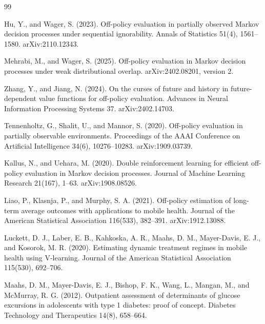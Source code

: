 \documentclass{article}
\begin{document}
\begin{thebibliography}{99}

   Hu, Y., and Wager, S. (2023). Off-policy evaluation in partially observed Markov decision processes under sequential ignorability. Annals of Statistics 51(4), 1561--1580. arXiv:2110.12343.

   Mehrabi, M., and Wager, S. (2025). Off-policy evaluation in Markov decision processes under weak distributional overlap. arXiv:2402.08201, version 2.

   Zhang, Y., and Jiang, N. (2024). On the curses of future and history in future-dependent value functions for off-policy evaluation. Advances in Neural Information Processing Systems 37. arXiv:2402.14703.

   Tennenholtz, G., Shalit, U., and Mannor, S. (2020). Off-policy evaluation in partially observable environments. Proceedings of the AAAI Conference on Artificial Intelligence 34(6), 10276--10283. arXiv:1909.03739.

   Kallus, N., and Uehara, M. (2020). Double reinforcement learning for efficient off-policy evaluation in Markov decision processes. Journal of Machine Learning Research 21(167), 1--63. arXiv:1908.08526.

   Liao, P., Klasnja, P., and Murphy, S. A. (2021). Off-policy estimation of long-term average outcomes with applications to mobile health. Journal of the American Statistical Association 116(533), 382--391. arXiv:1912.13088.

   Luckett, D. J., Laber, E. B., Kahkoska, A. R., Maahs, D. M., Mayer-Davis, E. J., and Kosorok, M. R. (2020). Estimating dynamic treatment regimes in mobile health using V-learning. Journal of the American Statistical Association 115(530), 692--706.

   Maahs, D. M., Mayer-Davis, E. J., Bishop, F. K., Wang, L., Mangan, M., and McMurray, R. G. (2012). Outpatient assessment of determinants of glucose excursions in adolescents with type 1 diabetes: proof of concept. Diabetes Technology and Therapeutics 14(8), 658--664.

\end{thebibliography}
\end{document}
